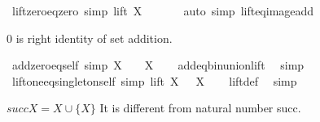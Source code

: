 \begin{isabellebody}
%
\isadelimproof
\isanewline
%
\endisadelimproof
\isanewline
{}\isamarkupfalse%
\ lift{\isacharunderscore}{\kern0pt}zero{\isacharunderscore}{\kern0pt}eq{\isacharunderscore}{\kern0pt}zero\ {\isacharbrackleft}{\kern0pt}simp{\isacharbrackright}{\kern0pt}{\isacharcolon}{\kern0pt}\ {\isachardoublequoteopen}lift\ X\ {}\ {\isacharequal}{\kern0pt}\ {}{\isachardoublequoteclose}\isanewline
%
\isadelimproof
\ \ %
\endisadelimproof
%
\isatagproof
{}\isamarkupfalse%
\ {\isacharparenleft}{\kern0pt}auto\ simp{\isacharcolon}{\kern0pt}\ lift{\isacharunderscore}{\kern0pt}eq{\isacharunderscore}{\kern0pt}image{\isacharunderscore}{\kern0pt}add{\isacharparenright}{\kern0pt}%
\endisatagproof
{\isafoldproof}%
%
\isadelimproof
%
\endisadelimproof
%
\begin{isamarkuptext}%
0 is right identity of set addition.%
\end{isamarkuptext}\isamarkuptrue%
\isamarkupfalse%
\ add{\isacharunderscore}{\kern0pt}zero{\isacharunderscore}{\kern0pt}eq{\isacharunderscore}{\kern0pt}self\ {\isacharbrackleft}{\kern0pt}simp{\isacharbrackright}{\kern0pt}{\isacharcolon}{\kern0pt}\ {\isachardoublequoteopen}X\ {\isacharplus}{\kern0pt}\ {}\ {\isacharequal}{\kern0pt}\ X{\isachardoublequoteclose}\isanewline
%
\isadelimproof
\ \ %
\endisadelimproof
%
\isatagproof
{}\isamarkupfalse%
\ add{\isacharunderscore}{\kern0pt}eq{\isacharunderscore}{\kern0pt}bin{\isacharunderscore}{\kern0pt}union{\isacharunderscore}{\kern0pt}lift\ \isamarkupfalse%
\ simp%
\endisatagproof
{\isafoldproof}%
%
\isadelimproof
\isanewline
%
\endisadelimproof
\isanewline
{}\isamarkupfalse%
\ lift{\isacharunderscore}{\kern0pt}one{\isacharunderscore}{\kern0pt}eq{\isacharunderscore}{\kern0pt}singleton{\isacharunderscore}{\kern0pt}self\ {\isacharbrackleft}{\kern0pt}simp{\isacharbrackright}{\kern0pt}{\isacharcolon}{\kern0pt}\ {\isachardoublequoteopen}lift\ X\ {}\ {\isacharequal}{\kern0pt}\ {\isacharbraceleft}{\kern0pt}X{\isacharbraceright}{\kern0pt}{\isachardoublequoteclose}\isanewline
%
\isadelimproof
\ \ %
\endisadelimproof
%
\isatagproof
{}\isamarkupfalse%
\ lift{\isacharunderscore}{\kern0pt}def\ \isamarkupfalse%
\ simp%
\endisatagproof
{\isafoldproof}%
%
\isadelimproof
%
\endisadelimproof
%
\begin{isamarkuptext}%
$succ X = X \cup \{X\}$ It is different from natural number succ.%
\end{isamarkuptext}\isamarkuptrue%

\end{isabellebody}
